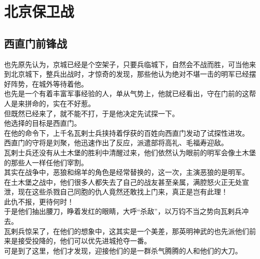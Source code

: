 \section{北京保卫战}
\ifnum{}
	\begin{multicols}{\theparacolNo}
\fi
\subsection{西直门前锋战}
也先原先认为，京城已经是个空架子，只要兵临城下，自然会不战而胜，可当他来到北京城下，整兵出战时，才惊奇的发现，那些他认为绝对不堪一击的明军已经摆好阵势，在城外等待着他。\\

也先是一个有着丰富军事经验的人，单从气势上，他就已经看出，守在门前的这帮人是来拼命的，实在不好惹。\\

但既然已经来了，就不能不打，于是他决定先试探一下。\\

他选择的目标是西直门。\\

在他的命令下，上千名瓦剌士兵挟持着俘获的百姓向西直门发动了试探性进攻。\\

西直门的守将是刘聚，他迅速作出了反应，派遣部将高礼、毛福寿迎敌。\\

瓦剌士兵还没有从土木堡的胜利中清醒过来，他们依然认为眼前的明军会像土木堡的那些人一样任他们宰割。\\

其实在战争中，恶狼和绵羊的角色是经常替换的，这一次，主演恶狼的是明军。\\

在土木堡之战中，他们很多人都失去了自己的战友甚至亲属，满腔怒火正无处宣泄，现在这些杀戮自己同胞的仇人竟然还敢找上门来，真正是岂有此理！\\

此仇不报，更待何时！\\

于是他们抽出腰刀，睁着发红的眼睛，大呼“杀敌”，以万钧不当之势向瓦剌兵冲去。\\

瓦剌兵惊呆了，在他们的想象中，这其实是一个美差，那英明神武的也先派他们前来是接受投降的，他们可以优先进城抢夺一番。\\

可是到了这里，他们才发现，迎接他们的是一群杀气腾腾的人和他们的大刀。\\


\end{multicols}
